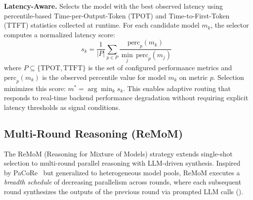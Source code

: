 \noindent\textbf{Latency-Aware.}
Selects the model with the best observed latency using percentile-based Time-per-Output-Token (TPOT) and Time-to-First-Token (TTFT) statistics collected at runtime.
For each candidate model $m_k$, the selector computes a normalized latency score:
\begin{equation}
  s_k = \frac{1}{|P|} \sum_{p \in P} \frac{\text{perc}_p(m_k)}{\min_{j}\, \text{perc}_p(m_j)}
\end{equation}
where $P \subseteq \{\text{TPOT}, \text{TTFT}\}$ is the set of configured performance metrics and $\text{perc}_p(m_k)$ is the observed percentile value for model $m_k$ on metric $p$.
Selection minimizes this score: $m^* = \arg\min_k s_k$.
This enables adaptive routing that responds to real-time backend performance degradation without requiring explicit latency thresholds as signal conditions.

\subsection{Multi-Round Reasoning (ReMoM)}

The ReMoM (Reasoning for Mixture of Models) strategy extends single-shot selection to multi-round parallel reasoning with LLM-driven synthesis.
Inspired by PaCoRe~\cite{pacore2025} but generalized to heterogeneous model pools, ReMoM executes a \emph{breadth schedule} of decreasing parallelism across rounds, where each subsequent round synthesizes the outputs of the previous round via prompted LLM calls ().

